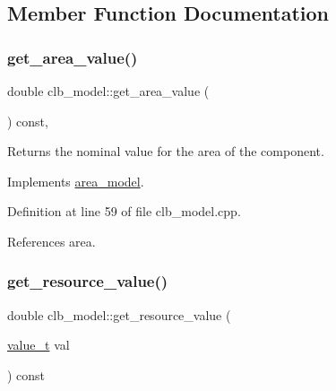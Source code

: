 \subsection{Member Function Documentation}
\mbox{\label{classclb__model_ad974c55b8a7022c383d3f9447d887dbb}} 
\subsubsection{\texorpdfstring{get\+\_\+area\+\_\+value()}{get\_area\_value()}}
{\footnotesize\ttfamily double clb\+\_\+model\+::get\+\_\+area\+\_\+value (\begin{DoxyParamCaption}{ }\end{DoxyParamCaption}) const\hspace{0.3cm}{\ttfamily [override]}, {\ttfamily [virtual]}}



Returns the nominal value for the area of the component. 



Implements \hyperlink{classarea__model_a390c12b38a4f2b1a137f6029d5494b97}{area\+\_\+model}.



Definition at line 59 of file clb\+\_\+model.\+cpp.



References area.

\mbox{\label{classclb__model_ae64d71f3b4302b41235c66b98075639e}} 
\subsubsection{\texorpdfstring{get\+\_\+resource\+\_\+value()}{get\_resource\_value()}}
{\footnotesize\ttfamily double clb\+\_\+model\+::get\+\_\+resource\+\_\+value (\begin{DoxyParamCaption}\item[{\hyperlink{classclb__model_a11a81df139e5752535807c276badbe21}{value\+\_\+t}}]{val }\end{DoxyParamCaption}) const}



